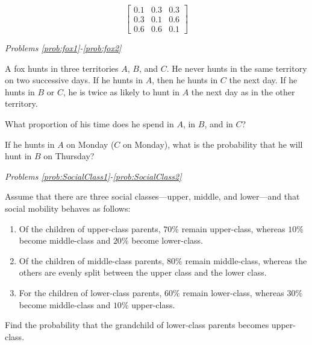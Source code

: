 \documentclass{ximera}
\begin{document}
\begin{problem}\label{prob:SteadyState&ProbVec5}
$$\begin{bmatrix}
0.1 & 0.3 & 0.3 \\
0.3 & 0.1 & 0.6 \\
0.6 & 0.6 & 0.1
\end{bmatrix}$$
\end{problem}


\emph{Problems \ref{prob:fox1}-\ref{prob:fox2}}

A fox hunts in three territories $A$, $B$, and $C$. He never hunts in the same territory on two successive days. If he hunts in $A$, then he hunts in $C$ the next day. If he hunts in $B$ or $C$, he is twice as likely to hunt in $A$ the next day as in the other territory.

\begin{problem}\label{prob:fox1}
What proportion of his time does he spend in $A$, in $B$, and in $C$?
\end{problem}

\begin{problem}\label{prob:fox2}
If he hunts in $A$ on Monday ($C$ on Monday), what is the probability that he will hunt in $B$ on Thursday?
\end{problem}


\emph{Problems \ref{prob:SocialClass1}-\ref{prob:SocialClass2}}

Assume that there are three social classes---upper, middle, and lower---and that social mobility behaves as follows:

\begin{enumerate}
\item Of the children of upper-class parents, $70\%$ remain upper-class, whereas $10\%$ become middle-class and $20\%$ become lower-class.

\item Of the children of middle-class parents, $80\%$ remain middle-class, whereas the others are evenly split between the upper class and the lower class.

\item For the children of lower-class parents, $60\%$ remain lower-class, whereas $30\%$ become middle-class and $10\%$ upper-class.
\end{enumerate}

\begin{problem}\label{prob:SocialClass1}
Find the probability that the grandchild of lower-class parents becomes upper-class.
\end{problem}
\end{document}
